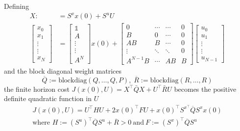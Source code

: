 \newpar{}

Defining
\begin{align*}
    X:              & =S^x x(0)+S^u U \\
    \begin{bmatrix}
        x_0    \\
        x_1    \\
        \vdots \\
        \vdots \\
        x_N
    \end{bmatrix} & =
    \begin{bmatrix}
        \mathbb{1} \\
        A          \\
        \vdots     \\
        \vdots     \\
        A^N
    \end{bmatrix}x(0)+
    \begin{bmatrix}
        0        & \cdots & \cdots & 0 \\
        B        & 0      & \cdots & 0 \\
        AB       & B      & \cdots & 0 \\
        \vdots   & \ddots & \ddots & 0 \\
        A^{N-1}B & \cdots & AB     & B
    \end{bmatrix}
    \begin{bmatrix}
        u_0    \\
        u_1    \\
        \vdots \\
        \vdots \\
        u_{N-1}
    \end{bmatrix}
\end{align*}
and the block diagonal weight matrices
\begin{equation*}
    \overline{Q}:=\mathrm{blockdiag}(Q,\dots,Q,P),\; \overline{R}:=\mathrm{blockdiag}(R,\dots,R)
\end{equation*}
the finite horizon cost $J(x(0), U) = X^{\top}\bar{Q}X + U^{\top}\bar{R}U$ becomes the positive definite quadratic function in $U$
\begin{gather*}
    J(x(0), U) =U^{\top}HU+2{x(0)}^{\top}FU+{x(0)}^{\top}S^{x^{\top}}\overline{Q}S^{x}x(0)\\
    \text{where } H:={(S^u)}^\top\overline{Q} S^u+\overline{R} > 0 \mathrm{~and~}F:={(S^x)}^\top\overline{Q} S^u
\end{gather*}


